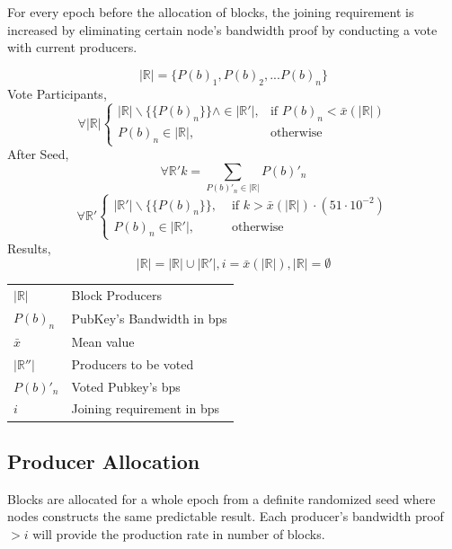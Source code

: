 \documentclass[a4paper,10pt]{article}
\makeatletter
\newenvironment{conditions}
  {\par\vspace{\abovedisplayskip}\noindent\begin{tabular}{>{$}l<{$} @{${}={}$} l}}
  {\end{tabular}\par\vspace{\belowdisplayskip}}
\makeatother
\begin{document}
For every epoch before the allocation of blocks, the joining  requirement is increased by eliminating certain node's bandwidth proof by conducting a vote with current producers.

\begin{equation*}
|\mathbb{R}| = \{P(b)_1,P(b)_2,...P(b)_n\} 
\end{equation*}
Vote Participants,
\begin{equation*}
\forall |\mathbb{R}| \begin{cases}
|\mathbb{R}| \backslash \{\{P(b)_n\}\} \wedge \in |\mathbb{R}'|, & \text{if } P(b)_n < \bar{x}(|\mathbb{R}|) \\
P(b)_n \in |\mathbb{R}|,  & \text{otherwise}
\end{cases}
\end{equation*}
After Seed,
\begin{equation*}
\forall \mathbb{R'} k = \sum_{P(b)'_n \in |\mathbb{R}|} P(b)'_n
\end{equation*}
\begin{equation*}
\forall \mathbb{R'} \begin{cases}
|\mathbb{R}'| \backslash \{\{P(b)_n\}\}, & \text{ if } k > \bar{x}(|\mathbb{R}|) \cdot (51 \cdot 10^{-2})\\
P(b)_n \in |\mathbb{R}'|, & \text{ otherwise}
\end{cases}
\end{equation*}
Results, 
\begin{equation*}
|\mathbb{R}| = |\mathbb{R}| {\displaystyle \cup } |\mathbb{R}'|, i = \bar{x}(|\mathbb{R}|), |\mathbb{R}|=\emptyset
\end{equation*}
\begin{conditions}
|\mathbb{R}| & Block Producers\\
P(b)_n & PubKey's Bandwidth in bps \\
\bar{x} & Mean value\\
|\mathbb{R}''| & Producers to be voted\\
P(b)'_n & Voted Pubkey's bps\\
i & Joining requirement in bps 
\end{conditions}

\subsection{Producer Allocation}

Blocks are allocated for a whole epoch from a definite randomized seed where nodes constructs the same predictable result. Each producer's bandwidth proof $> i$ will provide the production rate in number of blocks.
\end{document}
